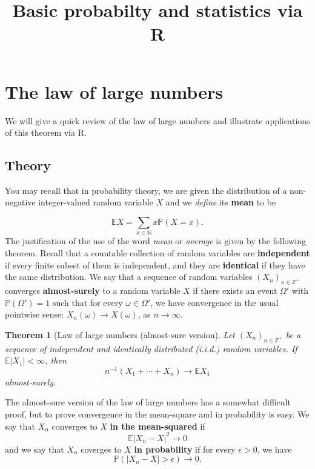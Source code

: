 \documentclass[
]{article}
\title{Basic probabilty and statistics via R}
\author{}
\date{\vspace{-2.5em}}
\newtheorem{theorem}{Theorem}[section]
\theoremstyle{definition}
\theoremstyle{definition}
\theoremstyle{definition}
\theoremstyle{remark}
\begin{document}
\maketitle

{
\setcounter{tocdepth}{2}
\tableofcontents
}
\hypertarget{the-law-of-large-numbers}{%
\section{The law of large numbers}\label{the-law-of-large-numbers}}

We will give a quick review of the law of large numbers and illustrate applications of this theorem via R.

\hypertarget{theory}{%
\subsection{Theory}\label{theory}}

You may recall that in probability theory, we are given the distribution of a non-negative integer-valued random variable \(X\) and we \emph{define} its \textbf{mean} to be

\[ \mathbb{E} X = \sum_{x\in \mathbb{N}} x \mathbb{P}(X=x).\]
The justification of the use of the word \emph{mean} or \emph{average} is given by the following theorem. Recall that a countable collection of random variables are \textbf{independent} if every finite subset of them is independent, and they are \textbf{identical} if they have the same distribution. We say that a sequence of random variables \((X_n)_{n \in \mathbb{Z}^+}\) converges \textbf{almost-surely} to a random variable \(X\) if there exists an event \(\Omega'\) with \(\mathbb{P}(\Omega') =1\) such that for every \(\omega \in \Omega'\), we have convergence in the usual pointwise sense: \(X_n(\omega) \to X(\omega)\), as \(n \to \infty\).

\begin{theorem}[Law of large numbers (almost-sure version]
\protect\hypertarget{thm:unnamed-chunk-1}{}{\label{thm:unnamed-chunk-1} \iffalse (Law of large numbers (almost-sure version) \fi{} } Let \((X_n)_{n \in \mathbb{Z}^{+}}\) be a sequence of independent and identically distributed (i.i.d.) random variables. If \(\mathbb{E} |X_1| < \infty\), then
\[ n^{-1}(X_1 + \cdots + X_n) \to \mathbb{E} X_1\]
almost-surely.\\
\end{theorem}

The almost-sure version of the law of large numbers has a somewhat difficult proof, but to prove convergence in the mean-square and in probability is easy. We say that \(X_n\) converges to \(X\) \textbf{in the mean-squared} if
\[ \mathbb{E} | X_n - X|^{2} \to 0\]
and we say that \(X_n\) coverges to \(X\) \textbf{in probability} if for every \(\epsilon >0\), we have
\[\mathbb{P} ( | X_n - X| > \epsilon) \to 0.\]
\end{document}
